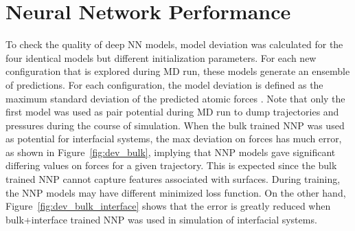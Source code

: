 \section{Neural Network Performance}
To check the quality of deep NN models, model deviation was calculated for the
four identical models but different initialization parameters. For each
new configuration that is explored during MD run, these models
generate an ensemble of predictions. For each configuration,
the model deviation is defined as the maximum standard deviation of the
predicted atomic forces \cite{zhang2019active}. Note that  only the  first
model was used as pair potential during MD run to dump trajectories and
pressures during the course of simulation. When the bulk trained NNP was
used as potential for interfacial systems, the max deviation on forces has much
error, as shown in Figure~\ref{fig:dev_bulk}, implying that NNP models gave
significant differing values on forces for
a given trajectory. This is expected since the bulk trained NNP cannot
capture features associated with surfaces. During training, the NNP models may
have different minimized loss function. On the other hand,
Figure~\ref{fig:dev_bulk_interface} shows that the error is greatly reduced
when bulk+interface trained NNP was used in simulation of interfacial systems.


